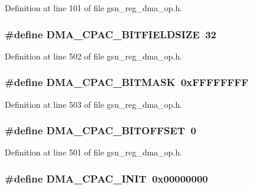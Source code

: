 Definition at line 101 of file gsn\_\-reg\_\-dma\_\-op.h.

\hypertarget{a00547_acdbb5f934b4ac2a30073ca24f65c9d90}{
\subsubsection[{DMA\_\-CPAC\_\-BITFIELDSIZE}]{\setlength{\rightskip}{0pt plus 5cm}\#define DMA\_\-CPAC\_\-BITFIELDSIZE~32}}
\label{a00547_acdbb5f934b4ac2a30073ca24f65c9d90}


Definition at line 502 of file gsn\_\-reg\_\-dma\_\-op.h.

\hypertarget{a00547_af1c0aa27b7d86a883d3ad593dd7ae040}{
\subsubsection[{DMA\_\-CPAC\_\-BITMASK}]{\setlength{\rightskip}{0pt plus 5cm}\#define DMA\_\-CPAC\_\-BITMASK~0xFFFFFFFF}}
\label{a00547_af1c0aa27b7d86a883d3ad593dd7ae040}


Definition at line 503 of file gsn\_\-reg\_\-dma\_\-op.h.

\hypertarget{a00547_a889aade1ad8ede0eb7a6ec9911811f43}{
\subsubsection[{DMA\_\-CPAC\_\-BITOFFSET}]{\setlength{\rightskip}{0pt plus 5cm}\#define DMA\_\-CPAC\_\-BITOFFSET~0}}
\label{a00547_a889aade1ad8ede0eb7a6ec9911811f43}


Definition at line 501 of file gsn\_\-reg\_\-dma\_\-op.h.

\hypertarget{a00547_afa5087223be1650ae0942f5e5866363b}{
\subsubsection[{DMA\_\-CPAC\_\-INIT}]{\setlength{\rightskip}{0pt plus 5cm}\#define DMA\_\-CPAC\_\-INIT~0x00000000}}
\label{a00547_afa5087223be1650ae0942f5e5866363b}


